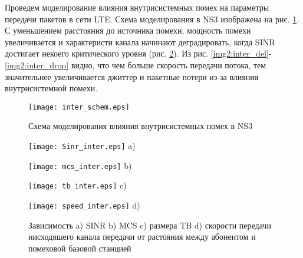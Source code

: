 Проведем моделирование влияния внутрисистемных помех на параметры передачи пакетов в сети LTE. Схема моделирования в NS3 изображена на рис. \ref{img:inter_schem}. С уменьшением расстояния до источника помехи, мощность помехи увеличивается и характеристи канала начинают деградировать, когда SINR достигает некоего критического уровня (рис. \ref{img:inter}).
Из рис. \ref{img2:inter_del}-\ref{img2:inter_drop} видно, что чем больше скорость передачи потока, тем значительнее увеличивается джиттер и пакетные потери из-за влияния внутрисистемной помехи.
\begin{figure} [!h]
  \center
\texttt{[image: inter\_schem.eps]}
  \caption{Схема моделирования влияния внутрисистемных помех в NS3}
  \label{img:inter_schem}
\end{figure}
\begin{figure} [!h]
\begin{minipage}[h]{0.47\linewidth}
\center
\texttt{[image: Sinr\_inter.eps]} a) \\
\end{minipage}
\hfill
\begin{minipage}[h]{0.47\linewidth}
\center
\texttt{[image: mcs\_inter.eps]} b) \\
\end{minipage}
\vfill
\begin{minipage}[h]{0.47\linewidth}
\center
\texttt{[image: tb\_inter.eps]} c) \\
\end{minipage}
\hfill
\begin{minipage}[h]{0.47\linewidth}
\center
\texttt{[image: speed\_inter.eps]} d) \\
\end{minipage}
\caption{Зависимость a) SINR b) MCS c) размера TB d) скорости передачи нисходяшего канала передачи от растояния между абонентом и помеховой базовой станцией}
\label{img:inter}
\end{figure}

\clearpage


